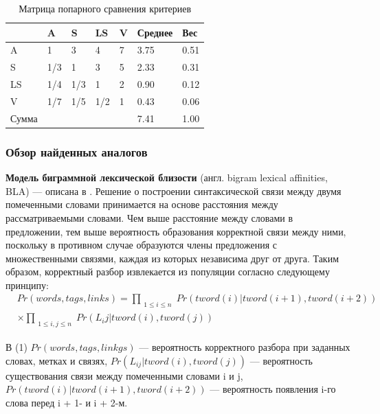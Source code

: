 \begin{table}[H]
\centering
\caption{Матрица попарного сравнения критериев}
{\small 
\begin{tabu}to \textwidth{ | X[c] | X[c] | X[c] | X[c] | X[c] | X[c] | X[c] | }
	\hline
          & A   & S   & LS  & V & Среднее & Вес  \\ \hline
	A     & 1   & 3   & 4   & 7 & 3.75    & 0.51 \\
	S     & 1/3 & 1   & 3   & 5 & 2.33    & 0.31 \\
	LS    & 1/4 & 1/3 & 1   & 2 & 0.90    & 0.12 \\
	V     & 1/7 & 1/5 & 1/2 & 1 & 0.43    & 0.06 \\ \hline
	Сумма &     &     &     &   & 7.41    & 1.00 \\
	\hline
\end{tabu}
}
\label{tab:crit}
\end{table}

\subsubsection{Обзор найденных аналогов}

\textbf{Модель биграммной лексической близости} (англ. bigram lexical affinities, BLA) --- описана в \cite{eisner}. Решение о построении синтаксической связи между двумя помеченными словами принимается на основе расстояния между рассматриваемыми словами. Чем выше расстояние между словами в предложении, тем выше вероятность образования корректной связи между ними, поскольку в противном случае образуются члены предложения с множественными связями, каждая из которых независима друг от друга. Таким образом, корректный разбор извлекается из популяции согласно следующему принципу: 
\begin{equation}\begin{split}
	& Pr(words, tags, links) = \prod_{\substack{1 \leq i \leq n}} Pr(tword(i) | tword(i + 1), tword(i + 2)) \\
    & \times\prod_{\substack{1 \leq i, j \leq n}} Pr(L_ij | tword(i), tword(j))
\end{split}\end{equation}

В (1) \(Pr(words, tags, linkgs)\) --- вероятность корректного разбора при заданных словах, метках и связях, \(Pr(L_{ij} | tword(i), tword(j))\) --- вероятность существования связи между помеченными словами i и j, \(Pr(tword(i) | tword(i + 1), tword(i + 2))\) --- вероятность появления i-го слова перед i + 1- и i + 2-м. 

